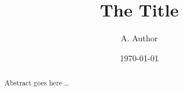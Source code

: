 \documentclass{article}
\title{The Title}
\author{A. Author}
\date{\today}
\begin{document}
\maketitle
\begin{abstract}
Abstract goes here \ldots
\end{abstract}
\end{document}
